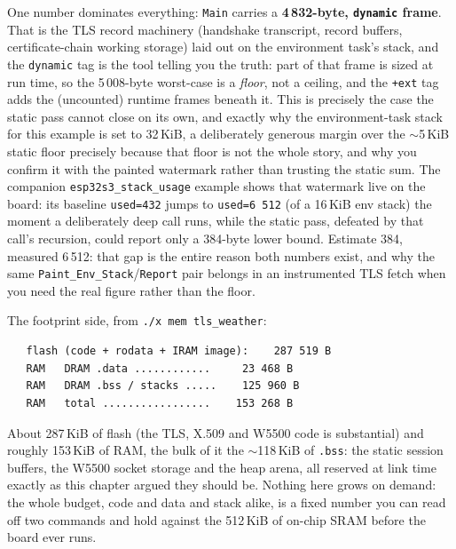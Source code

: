 \noindent
One number dominates everything: \texttt{Main} carries a \textbf{4\,832-byte,
\texttt{dynamic} frame}. That is the TLS record machinery (handshake transcript,
record buffers, certificate-chain working storage) laid out on the environment
task's stack, and the \texttt{dynamic} tag is the tool telling you the truth: part
of that frame is sized at run time, so the 5\,008-byte worst-case is a \emph{floor},
not a ceiling, and the \texttt{+ext} tag adds the (uncounted) runtime frames beneath
it. This is precisely the case the static pass cannot close on its own, and
exactly why the environment-task stack for this example is set to 32\,KiB, a
deliberately generous margin over the $\sim$5\,KiB static floor precisely because
that floor is not the whole story, and why you confirm it with the painted
watermark rather than trusting the static sum. The companion
\texttt{esp32s3\_stack\_usage} example shows that watermark live on the board: its
baseline \texttt{used=432} jumps to \texttt{used=6\,512} (of a 16\,KiB env stack)
the moment a deliberately deep call runs, while the static pass, defeated by that
call's recursion, could report only a 384-byte lower bound. Estimate 384,
measured 6\,512: that gap is the entire reason both numbers exist, and why the same
\texttt{Paint\_Env\_Stack}/\texttt{Report} pair belongs in an instrumented TLS fetch
when you need the real figure rather than the floor.

The footprint side, from \texttt{./x mem tls\_weather}:

\begin{lstlisting}
   flash (code + rodata + IRAM image):    287 519 B
   RAM   DRAM .data ............     23 468 B
   RAM   DRAM .bss / stacks .....    125 960 B
   RAM   total .................    153 268 B
\end{lstlisting}

\noindent
About 287\,KiB of flash (the TLS, X.509 and W5500 code is substantial) and roughly
153\,KiB of RAM, the bulk of it the $\sim$118\,KiB of \texttt{.bss}: the static
session buffers, the W5500 socket storage and the heap arena, all reserved at link
time exactly as this chapter argued they should be. Nothing here grows on demand:
the whole budget, code and data and stack alike, is a fixed number you can read off
two commands and hold against the 512\,KiB of on-chip SRAM before the board ever
runs.
